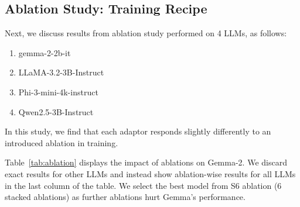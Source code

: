 \subsection{Ablation Study: Training Recipe}

Next, we discuss results from ablation study performed on 4 LLMs, as follows:

\begin{enumerate}
    \item gemma-2-2b-it
    \item LLaMA-3.2-3B-Instruct
    \item Phi-3-mini-4k-instruct
    \item Qwen2.5-3B-Instruct
\end{enumerate}

In this study, we find that each adaptor responds slightly differently to an introduced ablation in training.

Table~\ref{tab:ablation} displays the impact of ablations on Gemma-2. We discard exact results for other LLMs and instead show ablation-wise results for all LLMs in the last column of the table. We select the best model from S6 ablation (6 stacked ablations) as further ablations hurt Gemma's performance.

\begin{table}[ht]
\centering
\caption{Ablation study results on Gemma-2 and summary across 4 LLMs.}
\label{tab:ablation}
\end{table}

